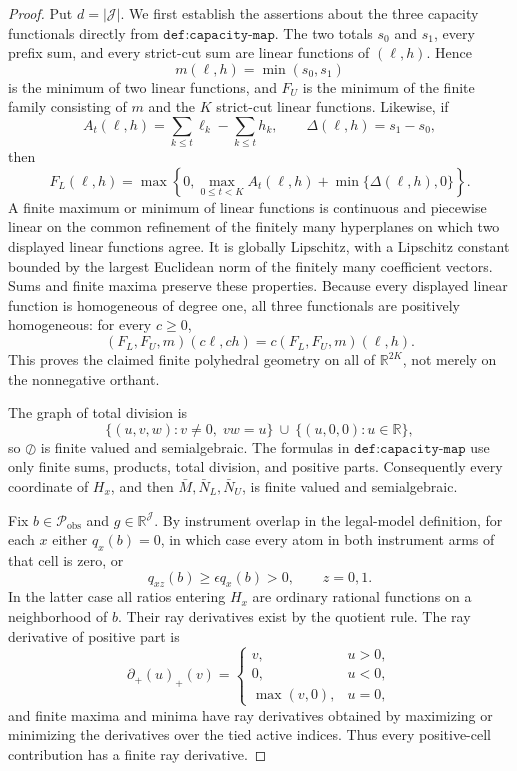 \documentclass{article}
\begin{document}
\begin{proof}
Put \(d=|\mathcal J|\).  We first establish the assertions about the three capacity functionals directly from \(\texttt{def:capacity-map}\).  The two totals \(s_0\) and \(s_1\), every prefix sum, and every strict-cut sum are linear functions of \((\ell,h)\).  Hence
\[
m(\ell,h)=\min(s_0,s_1)
\]
is the minimum of two linear functions, and \(F_U\) is the minimum of the finite family consisting of \(m\) and the \(K\) strict-cut linear functions.  Likewise, if
\[
A_t(\ell,h)=\sum_{k\le t}\ell_k-\sum_{k\le t}h_k,
\qquad \Delta(\ell,h)=s_1-s_0,
\]
then
\[
F_L(\ell,h)=\max\!\left\{0,\max_{0\le t<K}A_t(\ell,h)+\min\{\Delta(\ell,h),0\}\right\}.
\]
A finite maximum or minimum of linear functions is continuous and piecewise linear on the common refinement of the finitely many hyperplanes on which two displayed linear functions agree.  It is globally Lipschitz, with a Lipschitz constant bounded by the largest Euclidean norm of the finitely many coefficient vectors.  Sums and finite maxima preserve these properties.  Because every displayed linear function is homogeneous of degree one, all three functionals are positively homogeneous: for every \(c\ge0\),
\[
(F_L,F_U,m)(c\ell,ch)=c(F_L,F_U,m)(\ell,h).
\]
This proves the claimed finite polyhedral geometry on all of \(\mathbb R^{2K}\), not merely on the nonnegative orthant.

The graph of total division is
\[
\{(u,v,w):v\ne0,\;vw=u\}\ \cup\ \{(u,0,0):u\in\mathbb R\},
\]
so \(\oslash\) is finite valued and semialgebraic.  The formulas in \(\texttt{def:capacity-map}\) use only finite sums, products, total division, and positive parts.  Consequently every coordinate of \(H_x\), and then \(\bar M,\bar N_L,\bar N_U\), is finite valued and semialgebraic.

Fix \(b\in\mathcal P_{\mathrm{obs}}\) and \(g\in\mathbb R^{\mathcal J}\).  By instrument overlap in the legal-model definition, for each \(x\) either \(q_x(b)=0\), in which case every atom in both instrument arms of that cell is zero, or
\[
q_{xz}(b)\ge\epsilon q_x(b)>0,\qquad z=0,1.
\]
In the latter case all ratios entering \(H_x\) are ordinary rational functions on a neighborhood of \(b\).  Their ray derivatives exist by the quotient rule.  The ray derivative of positive part is
\[
\partial_+ (u)_+(v)=
\begin{cases}
v,&u>0,\\
0,&u<0,\\
\max(v,0),&u=0,
\end{cases}
\]
and finite maxima and minima have ray derivatives obtained by maximizing or minimizing the derivatives over the tied active indices.  Thus every positive-cell contribution has a finite ray derivative.


\end{proof}
\end{document}
